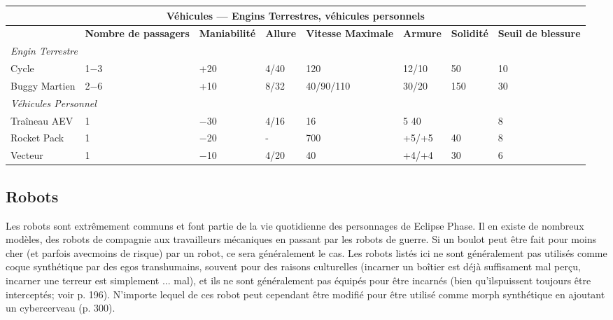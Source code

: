 \begin{table} \begin{tabularx}{\textwidth}{|l|X|X|X|X|X|X|X|} \hline

\multicolumn{8}{|c|}{\textbf{Véhicules --- Engins Terrestres, véhicules personnels}} \\ \hline

&\textbf{Nombre de passagers}	&\textbf{Maniabilité}	&\textbf{Allure}	&\textbf{Vitesse Maximale}	&\textbf{Armure}	&\textbf{Solidité}	&\textbf{Seuil de blessure} \\ \hline

\multicolumn{8}{|l|}{\emph{Engin Terrestre}} \\ \hline

Cycle	&1$-$3	&+20	&4/40	&120	&12/10	&50	&10 \\ \hline

Buggy Martien	&2$-$6	&+10	&8/32	&40/90/110	&30/20	&150	&30 \\ \hline

\multicolumn{8}{|l|}{\emph{Véhicules Personnel}} \\ \hline

Traîneau AEV	&1	&$-$30	&4/16	&16	&5 40	&&8 \\ \hline

Rocket Pack	&1	&$-$20	&- &700	&+5/+5	&40	&8 \\ \hline

Vecteur	&1	&$-$10	&4/20	&40	&+4/+4	&30	&6 \\ \hline

\end{tabularx} \label{tab:groundcraft-personal} \end{table} 

\subsection{Robots} \label{sec:robots} 

Les robots sont extrêmement communs et font partie de la vie quotidienne des personnages de  Eclipse Phase. Il en existe de nombreux modèles, des robots de compagnie aux travailleurs mécaniques en passant par les robots de guerre. Si un boulot peut être fait pour moins cher (et parfois avecmoins de risque) par un robot, ce sera généralement le cas. Les robots listés ici ne sont généralement pas utilisés comme coque synthétique par des egos transhumains, souvent pour des raisons culturelles (incarner un boîtier est déjà suffisament mal perçu, incarner une terreur est simplement ... mal), et ils ne sont généralement pas équipés pour être incarnés (bien qu'ilspuissent toujours être interceptés; voir p. 196). N'importe lequel de ces robot peut cependant être modifié pour être utilisé comme morph synthétique en ajoutant un cybercerveau (p. 300). 

